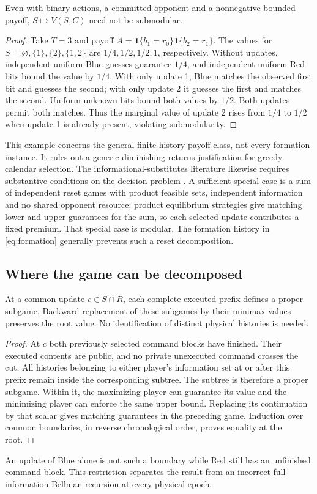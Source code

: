 \begin{proposition}\label{prop:counterexample}
Even with binary actions, a committed opponent and a nonnegative bounded
payoff, $S\mapsto V(S,C)$ need not be submodular.
\end{proposition}
\begin{proof}
Take $T=3$ and payoff
$A=\mathbf1\{b_1=r_0\}\mathbf1\{b_2=r_1\}$.
The values for $S=\varnothing,\{1\},\{2\},\{1,2\}$ are
$1/4,1/2,1/2,1$, respectively. Without updates, independent uniform Blue
guesses guarantee $1/4$, and independent uniform Red bits bound the value
by $1/4$. With only update 1, Blue matches the observed first bit and guesses
the second; with only update 2 it guesses the first and matches the second.
Uniform unknown bits bound both values by $1/2$. Both updates permit both
matches. Thus the marginal value of update 2 rises from $1/4$ to $1/2$
when update 1 is already present, violating submodularity.
\end{proof}
This example concerns the general finite history-payoff class, not every
formation instance. It rules out a generic diminishing-returns justification
for greedy calendar selection. The informational-substitutes literature
likewise requires substantive conditions on the decision problem
\citep{chen2017}. A sufficient special case is a sum of independent reset
games with product feasible sets, independent information and no shared
opponent resource: product equilibrium strategies give matching lower and
upper guarantees for the sum, so each selected update contributes a fixed
premium. That special case is modular. The formation history in
\eqref{eq:formation} generally prevents such a reset decomposition.

\subsection{Where the game can be decomposed}
\begin{theorem}\label{thm:decomposition}
At a common update $c\in S\cap R$, each complete executed prefix defines a
proper subgame. Backward replacement of these subgames by their minimax
values preserves the root value. No identification of distinct physical
histories is needed.
\end{theorem}
\begin{proof}
At $c$ both previously selected command blocks have finished. Their executed
contents are public, and no private unexecuted command crosses the cut.
All histories belonging to either player's information set at or after this
prefix remain inside the corresponding subtree. The subtree is therefore a
proper subgame. Within it, the maximizing player can guarantee its value
and the minimizing player can enforce the same upper bound. Replacing its
continuation by that scalar gives matching guarantees in the preceding
game. Induction over common boundaries, in reverse chronological order,
proves equality at the root.
\end{proof}
An update of Blue alone is not such a boundary while Red still has an
unfinished command block. This restriction separates the result from an
incorrect full-information Bellman recursion at every physical epoch.


